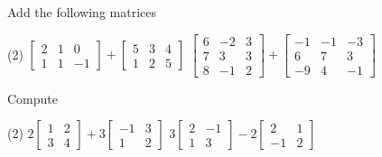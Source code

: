 \begin{exercise}
Add the following matrices
\begin{tasks}(2)
\task
$\begin{bmatrix}
2 & 1 & 0 \\
1 & 1 & -1
\end{bmatrix}
+
\begin{bmatrix}
5 & 3 & 4 \\
1 & 2 & 5
\end{bmatrix}$
\task
$\begin{bmatrix}
6 & -2 & 3 \\
7 & 3 & 3 \\
8 & -1 & 2
\end{bmatrix}
+
\begin{bmatrix}
-1 & -1 & -3 \\
6 & 7 & 3 \\
-9 & 4 & -1
\end{bmatrix}$
\end{tasks}
\end{exercise}

\begin{exercise}
Compute
\begin{tasks}(2)
\task
$2\begin{bmatrix}
1 & 2 \\
3 & 4
\end{bmatrix}
+
3
\begin{bmatrix}
-1 & 3 \\
1 & 2
\end{bmatrix}$
\task
$3\begin{bmatrix}
2 & -1 \\
1 & 3
\end{bmatrix}
-
2
\begin{bmatrix}
2 & 1 \\
-1 & 2
\end{bmatrix}$
\end{tasks}
\end{exercise}

